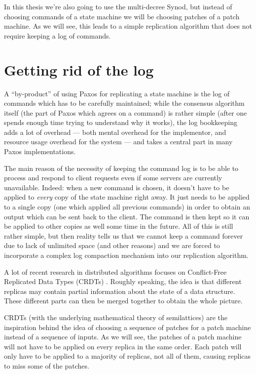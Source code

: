 \documentclass[12pt,a4paper,en]{pracamgr}
\newcommand{\ti}[1]{\textit{#1}}
\begin{document}
In this thesis we're also going to use the multi-decree Synod, but instead of choosing commands of a state machine we will be choosing patches of a patch machine. As we will see, this leads to a simple replication algorithm that does not require keeping a log of commands.

\section{Getting rid of the log}

A ``by-product'' of using Paxos for replicating a state machine is the log of commands which has to be carefully maintained; while the consensus algorithm itself (the part of Paxos which agrees on a command) is rather simple (after one spends enough time trying to understand why it works), the log bookkeeping adds a lot of overhead --- both mental overhead for the implementor, and resource usage overhead for the system --- and takes a central part in many Paxos implementations.

The main reason of the necessity of keeping the command log is to be able to process and respond to client requests even if some servers are currently unavailable. Indeed: when a new command is chosen, it doesn't have to be applied to \ti{every} copy of the state machine right away. It just needs to be applied to a single copy (one which applied all previous commands) in order to obtain an output which can be sent back to the client. The command is then kept so it can be applied to other copies as well some time in the future. All of this is still rather simple, but then reality tells us that we cannot keep a command forever due to lack of unlimited space (and other reasons) and we are forced to incorporate a complex log compaction mechanism into our replication algorithm.

A lot of recent research in distributed algorithms focuses on Conflict-Free Replicated Data Types (CRDTs) \cite{crdts}. Roughly speaking, the idea is that different replicas may contain partial information about the state of a data structure. These different parts can then be merged together to obtain the whole picture.

CRDTs (with the underlying mathematical theory of semilattices) are the inspiration behind the idea of choosing a sequence of patches for a patch machine instead of a sequence of inputs. As we will see, the patches of a patch machine will not have to be applied on every replica in the same order. Each patch will only have to be applied to a majority of replicas, not all of them, causing replicas to miss some of the patches.
\end{document}
